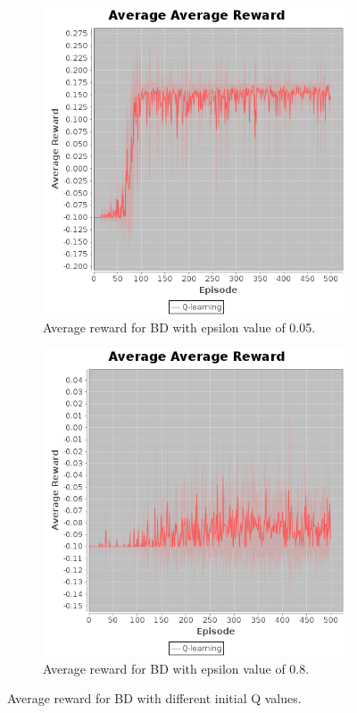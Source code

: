 \documentclass[10pt, twocolumn]{article}
\begin{document}
			\begin{figure}[]
				\centering
				\begin{subfigure}[t]{0.24\textwidth}
					\centering
					\includegraphics[width=\textwidth]{../graphics/BlockDude_0.05_epsilon.png}
					\caption{Average reward for BD with epsilon value of 0.05.}
					\label{fig:BD:epsilon1}
				\end{subfigure}
				\begin{subfigure}[t]{0.24\textwidth}
					\centering
					\includegraphics[width=\textwidth]{../graphics/BlockDude_0.8_epsilon.png}
					\caption{Average reward for BD with epsilon value of 0.8.}
					\label{fig:BD:epsilon2}
				\end{subfigure}
				\caption{Average reward for BD with different initial Q values.}
				\label{fig:BD:aepsilon}
			\end{figure}
\end{document}
